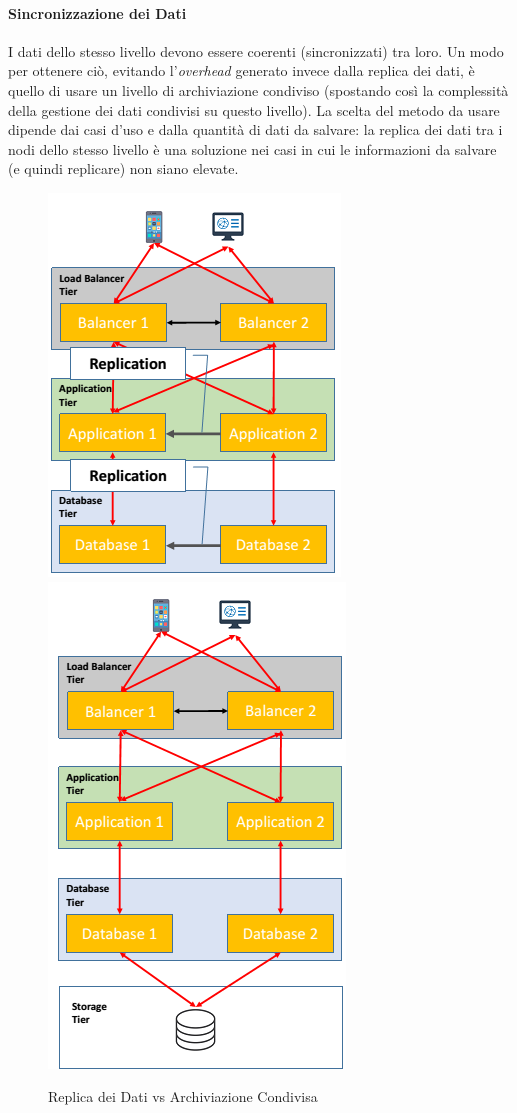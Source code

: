 \documentclass{article}
\begin{document}
\paragraph{Sincronizzazione dei Dati}
I dati dello stesso livello devono essere coerenti (sincronizzati) tra loro. Un modo per ottenere ciò, evitando l’\textit{overhead} generato invece dalla replica dei dati, è quello di usare un livello di archiviazione condiviso (spostando così la complessità della gestione dei dati condivisi su questo livello). 
La scelta del metodo da usare dipende dai casi d’uso e dalla quantità di dati da salvare: la replica dei dati tra i nodi dello stesso livello è una soluzione nei casi in cui le informazioni da salvare (e quindi replicare) non siano elevate.
\begin{figure}[H]
\centering
\includegraphics[scale=0.6]{img/DataSync_Replica.png}
\includegraphics[scale=0.6]{img/DataSync_SharedStorage.png}
\caption{Replica dei Dati vs Archiviazione Condivisa}
\end{figure}
\end{document}
